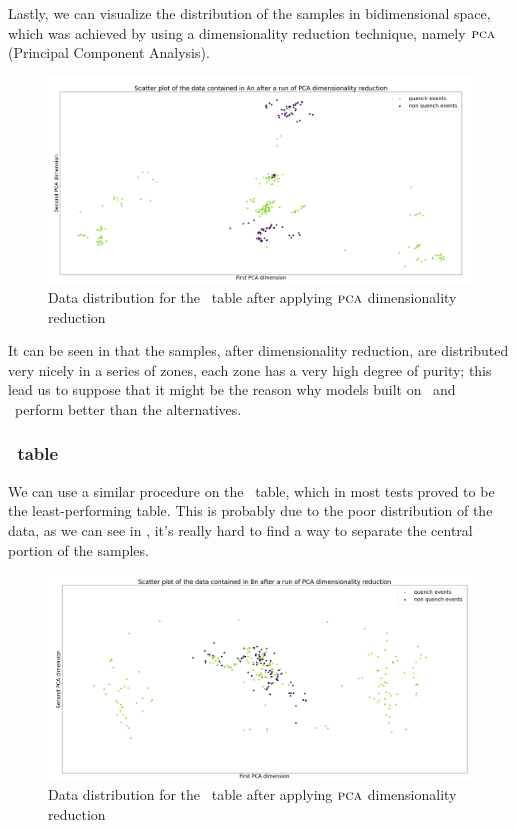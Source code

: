 Lastly, we can visualize the distribution of the samples in bidimensional space, which was achieved
by using a dimensionality reduction technique, namely $\textsc{pca}$ (Principal Component Analysis).
\begin{figure}[h!]
	\centering
	\includegraphics[width=\linewidth]{img/An_distribution.png}
	\caption{Data distribution for the \an\ table after applying $\textsc{pca}$ dimensionality
		reduction} \label{fig:an-dist}
\end{figure}

It can be seen in  that the samples, after dimensionality reduction, are distributed very nicely in a series
of zones, each zone has a very high degree of purity; this lead us to suppose that it might be the
reason why models built on \an\ and \cnmod\ perform better than the alternatives.

\subsubsection{\bn\ table}
We can use a similar procedure on the \bn\ table, which in most tests proved to be the
least-performing table. This is probably due to the poor distribution of the data, as we can see in
, it's really hard to find a way to separate the central portion of the samples.
\begin{figure}[h!]
	\centering
	\includegraphics[width=\linewidth]{img/Bn_distribution.png}
	\caption{Data distribution for the \bn\ table after applying $\textsc{pca}$ dimensionality
		reduction} \label{fig:bn-dist}
\end{figure}

